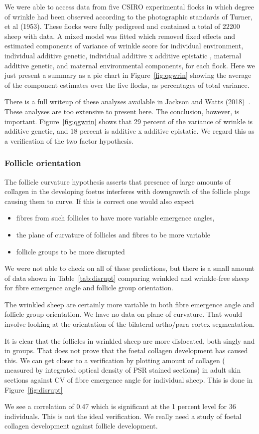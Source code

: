 \documentclass[titlepage]{article}  %
\begin{document}
We were able to access data from five CSIRO experimental flocks in which degree of wrinkle had been observed according to the photographic standards of Turner, et al (1953). These flocks were fully pedigreed and contained a total of 22200 sheep with data. A mixed model was fitted which removed fixed effects and estimated components of variance of wrinkle score  for individual environment, individual additive genetic, individual additive x additive epistatic , maternal additive genetic, and maternal environmental components, for each flock.  Here we just present a summary as a pie chart in Figure~\ref{fig:qgwrin} showing the average of the component estimates over the five flocks, as percentages of total variance. 

There is a full writeup of these analyses available in Jackson and Watts (2018)~\cite{jack:18}. These analyses are too extensive to present here. The conclusion, however, is important. Figure~\ref{fig:qgwrin} shows that 29 percent of the variance of wrinkle is additive genetic, and 18 percent is additive x additive epistatic. We regard this as a verification of the two factor hypothesis.


\subsubsection{Follicle orientation}
The follicle curvature hypothesis asserts that presence of large amounts of collagen in the developing foetus interferes with downgrowth of the follicle plugs causing them to curve. If this is correct one would also expect 
\begin{itemize}
\item fibres from such follicles to have more variable emergence angles, 
\item the plane of curvature of follicles and fibres to be more variable
\item follicle groups to be more disrupted
\end{itemize}

We were not able to check on all of these predictions, but there is a small amount of data shown in Table~\ref{tab:disrupt} comparing wrinkled and wrinkle-free sheep for fibre emergence angle and follicle group orientation.

The wrinkled sheep are certainly more variable in both fibre emergence angle and follicle group orientation. We have no data on plane of curvature. That would involve looking at the orientation of the bilateral ortho/para cortex segmentation.

It is clear that the follicles in wrinkled sheep are more dislocated, both singly and in groups. That does not prove that the foetal collagen development  has caused this.  We can get closer to a verification by plotting amount of collagen ( measured by integrated optical density of PSR stained sections) in adult skin sections against CV of fibre emergence angle for individual sheep. This is done in Figure~\ref{fig:disrupt}

We see a correlation of 0.47 which is significant at the 1 percent level for 36 individuals.  This is not the ideal verification. We really need a study of foetal collagen development against follicle development.
\end{document}

